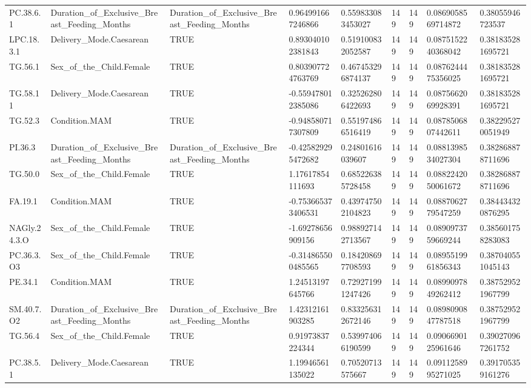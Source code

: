 \begin{longtable}{lllllllll}
PC.38.6.1 & Duration\_of\_Exclusive\_Breast\_Feeding\_Months & Duration\_of\_Exclusive\_Breast\_Feeding\_Months & 0.964991667246866 & 0.559833083453027 & 149 & 149 & 0.0869058569714872 & 0.38055946723537 \\
LPC.18.3.1 & Delivery\_Mode.Caesarean & TRUE & 0.893040102381843 & 0.519100832052587 & 149 & 149 & 0.0875152240368042 & 0.381835281695721 \\
TG.56.1 & Sex\_of\_the\_Child.Female & TRUE & 0.803907724763769 & 0.467453296874137 & 149 & 149 & 0.0876244475356025 & 0.381835281695721 \\
TG.58.11 & Delivery\_Mode.Caesarean & TRUE & -0.559478012385086 & 0.325262806422693 & 149 & 149 & 0.0875662069928391 & 0.381835281695721 \\
TG.52.3 & Condition.MAM & TRUE & -0.948580717307809 & 0.551974866516419 & 149 & 149 & 0.0878506807442611 & 0.382295270051949 \\
PI.36.3 & Duration\_of\_Exclusive\_Breast\_Feeding\_Months & Duration\_of\_Exclusive\_Breast\_Feeding\_Months & -0.425829295472682 & 0.24801616039607 & 149 & 149 & 0.0881398534027304 & 0.382868878711696 \\
TG.50.0 & Sex\_of\_the\_Child.Female & TRUE & 1.17617854111693 & 0.685226385728458 & 149 & 149 & 0.0882242050061672 & 0.382868878711696 \\
FA.19.1 & Condition.MAM & TRUE & -0.753665373406531 & 0.439747502104823 & 149 & 149 & 0.0887062779547259 & 0.384434320876295 \\
NAGly.24.3.O & Sex\_of\_the\_Child.Female & TRUE & -1.69278656909156 & 0.988927142713567 & 149 & 149 & 0.0890973759669244 & 0.385601758283083 \\
PC.36.3.O3 & Sex\_of\_the\_Child.Female & TRUE & -0.314865500485565 & 0.184208697708593 & 149 & 149 & 0.0895519961856343 & 0.387040551045143 \\
PE.34.1 & Condition.MAM & TRUE & 1.24513197645766 & 0.729271991247426 & 149 & 149 & 0.0899097849262412 & 0.387529521967799 \\
SM.40.7.O2 & Duration\_of\_Exclusive\_Breast\_Feeding\_Months & Duration\_of\_Exclusive\_Breast\_Feeding\_Months & 1.42312161903285 & 0.833256312672146 & 149 & 149 & 0.0898090847787518 & 0.387529521967799 \\
TG.56.4 & Sex\_of\_the\_Child.Female & TRUE & 0.91973837224344 & 0.539974066190599 & 149 & 149 & 0.0906690125961646 & 0.390270967261752 \\
PC.38.5.1 & Delivery\_Mode.Caesarean & TRUE & 1.19946561135022 & 0.70520713575667 & 149 & 149 & 0.0911258995271025 & 0.391705359161276 \\

\end{longtable}
